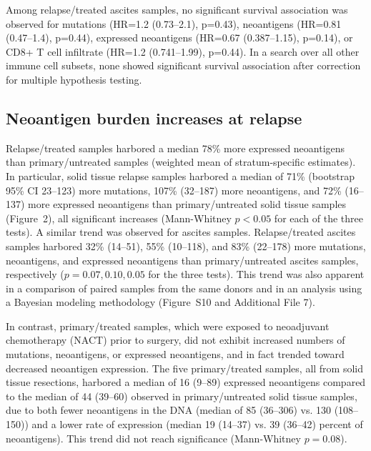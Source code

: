 \documentclass{bmcart}
\begin{document}
Among relapse/treated ascites samples, no significant survival association was observed for mutations (HR=1.2 (0.73--2.1), p=0.43), neoantigens (HR=0.81 (0.47--1.4), p=0.44), expressed neoantigens (HR=0.67 (0.387--1.15), p=0.14), or CD8+ T cell infiltrate (HR=1.2 (0.741--1.99), p=0.44). In a search over all other immune cell subsets, none showed significant survival association after correction for multiple hypothesis testing.


\subsection*{Neoantigen burden increases at relapse}

Relapse/treated samples harbored a median 78\% more expressed neoantigens than primary/untreated samples (weighted mean of stratum-specific estimates). In particular, solid tissue relapse samples harbored a median of 71\% (bootstrap 95\% CI 23--123) more mutations, 107\% (32--187) more neoantigens, and 72\% (16--137) more expressed neoantigens than primary/untreated solid tissue samples (Figure~2), all significant increases (Mann-Whitney $p < 0.05$ for each of the three tests). A similar trend was observed for ascites samples. Relapse/treated ascites samples harbored 32\% (14--51), 55\% (10--118), and 83\% (22--178) more mutations, neoantigens, and expressed neoantigens than primary/untreated ascites samples, respectively ($p=0.07, 0.10, 0.05$ for the three tests). This trend was also apparent in a comparison of paired samples from the same donors and in an analysis using a Bayesian modeling methodology (Figure~S10 and Additional File 7).

In contrast, primary/treated samples, which were exposed to neoadjuvant chemotherapy (NACT) prior to surgery, did not exhibit increased numbers of mutations, neoantigens, or expressed neoantigens, and in fact trended toward decreased neoantigen expression. The five primary/treated samples, all from solid tissue resections, harbored a median of 16 (9--89) expressed neoantigens compared to the median of 44 (39--60) observed in primary/untreated solid tissue samples, due to both fewer neoantigens in the DNA (median of 85 (36--306) vs. 130 (108--150)) and a lower rate of expression (median 19 (14--37) vs. 39 (36--42) percent of neoantigens). This trend did not reach significance (Mann-Whitney $p=0.08$).
\end{document}
